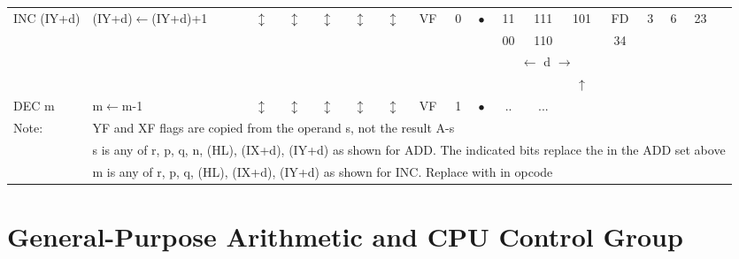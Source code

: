 \documentclass[oneside,a4paper]{book}
\begin{document}
{\begin{tabular}{llcccccccccccccccl}
		INC (IY+d) & (IY+d)$\leftarrow$(IY+d)+1 & 
			$\updownarrow$ & $\updownarrow$ & $\updownarrow$ & $\updownarrow$ & $\updownarrow$ & VF & 0 & $\bullet$ & 11 & 111 & 101 & 
			FD & 3 & 
			6 & 23 & \\ 
		\multicolumn{10}{c}{} & 00 & 110 & \fbox{100} & 34 & \\
		\multicolumn{10}{c}{} & \multicolumn{3}{c}{$\longleftarrow$ d $\longrightarrow$} &  \\[4pt]

	& & & & & & & & & & & & $\uparrow$ & & & & & \\[4pt]

		DEC m & m$\leftarrow$m-1 & 
			$\updownarrow$ & $\updownarrow$ & $\updownarrow$ & $\updownarrow$ & $\updownarrow$ & VF & 1 & $\bullet$ &
			.. & ... & \fbox{101}
			& & 
			& & & \\[4pt]

	\hline

		Note: & \multicolumn{17}{l}{
			\parbox{12cm}{\footnotemark[1]YF and XF flags are copied from the operand s, not the result A-s}
		} \\[2pt]
		
		& \multicolumn{17}{l}{
			\parbox{12cm}{s is any of r, p, q, n, (HL), (IX+d), (IY+d) as shown for ADD. The indicated bits replace the  in the ADD set above}
		} \\[5pt]
		
		& \multicolumn{17}{l}{
			\parbox{12cm}{m is any of r, p, q, (HL), (IX+d), (IY+d) as shown for INC. Replace  with  in opcode}
		} \\
	
	\hline

	\end{tabular}
}


\section{General-Purpose Arithmetic and CPU Control Group}
\end{document}
